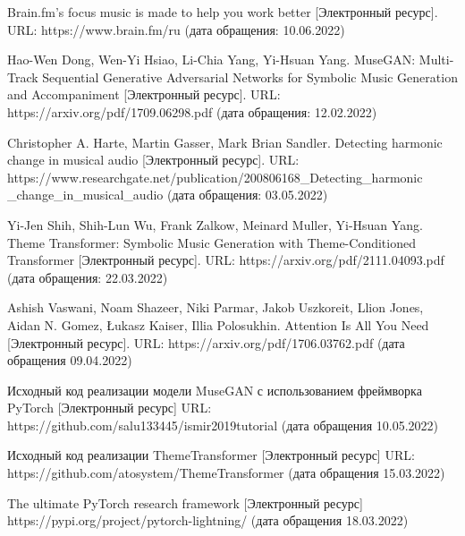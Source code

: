 \documentclass{disser}
\begin{document}
	
	
\begin{thebibliography}{99}
      Brain.fm's focus music is made to help you work better [Электронный ресурс]. URL: https://www.brain.fm/ru (дата обращения: 10.06.2022)
    
    
      Hao-Wen Dong, Wen-Yi Hsiao, Li-Chia Yang, Yi-Hsuan Yang.  %
      MuseGAN: Multi-Track Sequential Generative Adversarial Networks for Symbolic Music Generation and Accompaniment %
      [Электронный ресурс]. 
      URL: https://arxiv.org/pdf/1709.06298.pdf (дата обращения: 12.02.2022)
    
      Christopher A. Harte, Martin Gasser, Mark Brian Sandler.
      Detecting harmonic change in musical audio
      [Электронный ресурс].
      URL:
      https://www.researchgate.net/publication/200806168\_Detecting\_harmonic
      \_change\_in\_musical\_audio
      (дата обращения: 03.05.2022)
    
      Yi-Jen Shih, Shih-Lun Wu, Frank Zalkow, Meinard Muller, Yi-Hsuan Yang.
      Theme Transformer: Symbolic Music Generation with Theme-Conditioned Transformer
      [Электронный ресурс].
      URL: https://arxiv.org/pdf/2111.04093.pdf
      (дата обращения: 22.03.2022)
    
      Ashish Vaswani, Noam Shazeer, Niki Parmar, Jakob Uszkoreit, Llion Jones, Aidan N. Gomez, Łukasz Kaiser, Illia Polosukhin. 
      Attention Is All You Need 
      [Электронный ресурс].
      URL: https://arxiv.org/pdf/1706.03762.pdf (дата обращения 09.04.2022)
    
      Исходный код реализации модели MuseGAN с использованием фреймворка PyTorch [Электронный ресурс] URL: https://github.com/salu133445/ismir2019tutorial (дата обращения 10.05.2022)
    
      Исходный код реализации ThemeTransformer [Электронный ресурс] URL: https://github.com/atosystem/ThemeTransformer (дата обращения 15.03.2022)
    
      The ultimate PyTorch research framework [Электронный ресурс] https://pypi.org/project/pytorch-lightning/ (дата обращения 18.03.2022)
    

\end{thebibliography}
\end{document}
